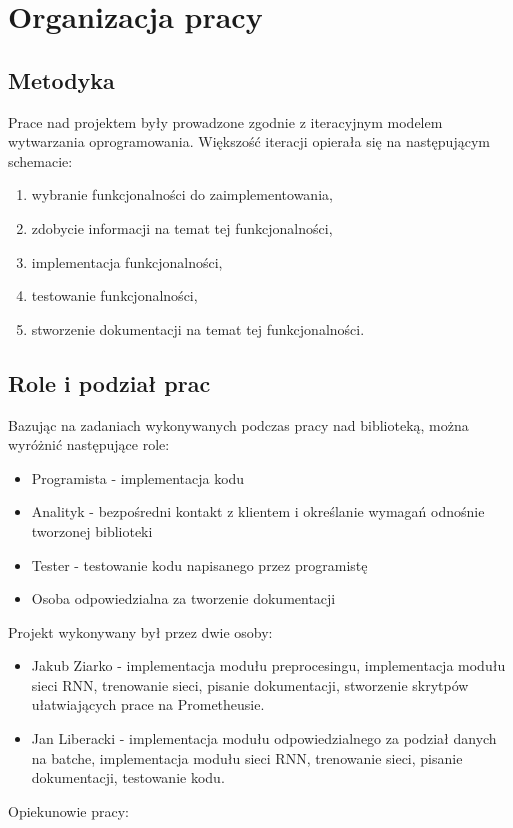 \newpage
\section{Organizacja pracy}

\subsection{Metodyka}

Prace nad projektem były prowadzone zgodnie z iteracyjnym modelem wytwarzania oprogramowania.
Większość iteracji opierała się na następującym schemacie:
\begin{enumerate}
  \item wybranie funkcjonalności do zaimplementowania,
  \item zdobycie informacji na temat tej funkcjonalności,
  \item implementacja funkcjonalności,
  \item testowanie funkcjonalności,
  \item stworzenie dokumentacji na temat tej funkcjonalności.
\end{enumerate}

\subsection{Role i podział prac}
Bazując na zadaniach wykonywanych podczas pracy nad biblioteką, można wyróżnić następujące role:
\begin{itemize}
  \item Programista - implementacja kodu
  \item Analityk -  bezpośredni kontakt z klientem i określanie wymagań odnośnie tworzonej biblioteki
  \item Tester - testowanie kodu napisanego przez programistę
  \item Osoba odpowiedzialna za tworzenie dokumentacji
\end{itemize}
Projekt wykonywany był przez dwie osoby:
\begin{itemize}
  \item Jakub Ziarko - implementacja modułu preprocesingu, implementacja modułu sieci RNN,
  trenowanie sieci, pisanie dokumentacji, stworzenie skrytpów ułatwiających prace na Prometheusie.
  \item Jan Liberacki - implementacja modułu odpowiedzialnego za podział danych na batche,
  implementacja modułu sieci RNN, trenowanie sieci, pisanie dokumentacji, testowanie kodu.
\end{itemize}
Opiekunowie pracy:

